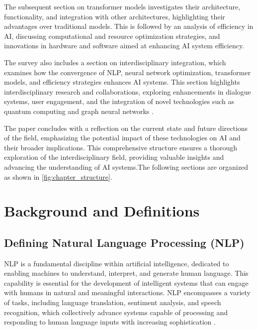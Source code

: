 The subsequent section on transformer models investigates their architecture, functionality, and integration with other architectures, highlighting their advantages over traditional models. This is followed by an analysis of efficiency in AI, discussing computational and resource optimization strategies, and innovations in hardware and software aimed at enhancing AI system efficiency.



The survey also includes a section on interdisciplinary integration, which examines how the convergence of NLP, neural network optimization, transformer models, and efficiency strategies enhances AI systems. This section highlights interdisciplinary research and collaborations, exploring enhancements in dialogue systems, user engagement, and the integration of novel technologies such as quantum computing and graph neural networks .



The paper concludes with a reflection on the current state and future directions of the field, emphasizing the potential impact of these technologies on AI and their broader implications. This comprehensive structure ensures a thorough exploration of the interdisciplinary field, providing valuable insights and advancing the understanding of AI systems.The following sections are organized as shown in \autoref{fig:chapter_structure}.








\section{Background and Definitions} \label{sec:Background and Definitions}



\subsection{Defining Natural Language Processing (NLP)} \label{subsec:Defining NLP}

NLP is a fundamental discipline within artificial intelligence, dedicated to enabling machines to understand, interpret, and generate human language. This capability is essential for the development of intelligent systems that can engage with humans in natural and meaningful interactions. NLP encompasses a variety of tasks, including language translation, sentiment analysis, and speech recognition, which collectively advance systems capable of processing and responding to human language inputs with increasing sophistication .



